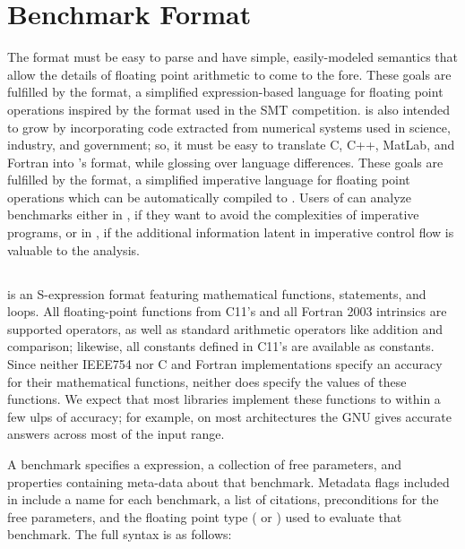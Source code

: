 \documentclass[main.tex]{subfiles}
\begin{document}
\section{Benchmark Format}
\label{sec:format}

The \name format must be easy to parse
  and have simple, easily-modeled semantics
  that allow the details of floating point arithmetic
  to come to the fore.
These goals are fulfilled by the \core format,
  a simplified expression-based language for floating point operations
  inspired by the \smtlib format used in the SMT competition.
\name is also intended to grow
  by incorporating code extracted
  from numerical systems used in science, industry, and government;
  so, it must be easy to translate C, C++, MatLab, and Fortran
  into \name's format,
  while glossing over language differences.
These goals are fulfilled by the \surface format,
  a simplified imperative language for floating point operations
  which can be automatically compiled to \core.
Users of \name can analyze benchmarks either in \core,
  if they want to avoid the complexities of imperative programs,
  or in \surface,
  if the additional information latent in imperative control flow
  is valuable to the analysis.
  
\subsection{\core}

\core is an S-expression format featuring
  mathematical functions,  statements, and  loops.
All floating-point functions
  from C11's  and all Fortran 2003 intrinsics
  are supported operators,
  as well as standard arithmetic operators like addition and comparison;
  likewise, all constants defined in C11's  are available as constants.
Since neither IEEE754 nor C and Fortran implementations specify
  an accuracy for their mathematical functions,
  neither does \core specify the values of these functions.
We expect that most libraries implement these functions
  to within a few ulps of accuracy;
  for example, on most architectures
  the GNU  gives accurate answers across most of the input range.

A \core benchmark specifies a \core expression,
  a collection of free parameters,
  and properties containing meta-data about that benchmark.
Metadata flags included in \name include a name for each benchmark,
  a list of citations, preconditions for the free parameters,
  and the floating point type ( or )
  used to evaluate that benchmark.
The full \core syntax is as follows:
\end{document}
